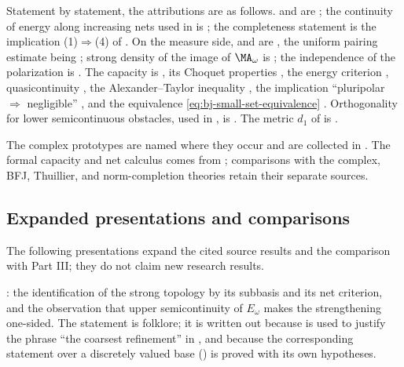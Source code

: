 Statement by statement, the attributions are as follows.
 and  are
\cite[\S12.1 and Theorem~12.4]{BJ22}; the continuity of energy along increasing nets used in
 is
\cite[Theorem~12.5]{BJ22}; the completeness
statement is the implication (1)$\Rightarrow$(4) of
\cite[Theorem~12.8]{BJ22}.  On the measure side,
 and  are
\cite[Theorems~10.2--10.3, 10.12 and~10.14]{BJ22}, the uniform pairing
estimate being \cite[Theorem~10.3]{BJ22}; strong density of the image of
$\MA_\omega$ is \cite[Corollary~10.13]{BJ22}; the independence of the
polarization is \cite[Corollary~9.21 and Proposition~10.16]{BJ22}.  The
capacity is \cite[\S7.7]{BJ22}, its Choquet properties
\cite[Propositions~13.3--13.4, Corollary~13.13 and Theorem~13.29]{BJ22},
the energy criterion \cite[Lemma~7.47]{BJ22}, quasicontinuity
\cite[Theorem~13.9 and Corollary~13.10]{BJ22}, the Alexander--Taylor
inequality \cite[Theorem~13.14]{BJ22}, the implication ``pluripolar
$\Rightarrow$ negligible'' \cite[Proposition~5.3]{BJ22}, and the
equivalence \eqref{eq:bj-small-set-equivalence}
\cite[Theorems~13.14 and~13.17]{BJ22}.  Orthogonality for lower
semicontinuous obstacles, used in , is
\cite[Theorem~13.1]{BJ22}.  The metric $d_1$ of
 is \cite[Theorem~B]{BJKS1}.

The complex prototypes are named where they occur and are collected in
.  The formal capacity and net calculus comes from
; comparisons with the complex,
BFJ, Thuillier, and norm-completion theories retain their separate sources.

\subsection{Expanded presentations and comparisons}
\label{sec:ch48-additions}

The following presentations expand the cited source results and the
comparison with Part III; they do not claim new research results.

: the identification of the strong topology by
its subbasis and its net criterion, and the observation that upper
semicontinuity of $E_\omega$ makes the strengthening one-sided.  The
statement is folklore; it is written out because
 is used to justify the phrase ``the
coarsest refinement'' in , and because
the corresponding statement over a discretely valued base
() is proved with its own hypotheses.

